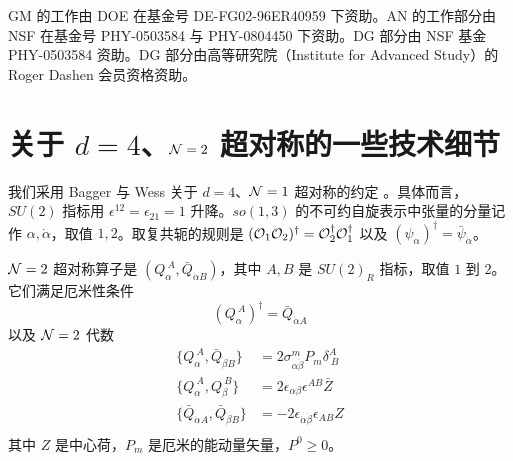 GM 的工作由 DOE 在基金号 DE-FG02-96ER40959 下资助。AN 的工作部分由 NSF 在基金号 PHY-0503584 与 PHY-0804450 下资助。DG 部分由 NSF 基金 PHY-0503584 资助。DG 部分由高等研究院（Institute for Advanced Study）的 Roger Dashen 会员资格资助。

\appendix

\section{关于 $d=4$、$\mathcal{N}=2$ 超对称的一些技术细节}
\label{app:Susy-Conventions}

我们采用 Bagger 与 Wess 关于 $d=4$、$\mathcal{N}=1$ 超对称的约定 \cite{Wess:1992cp}。具体而言，$SU(2)$ 指标用 $\epsilon^{12}= \epsilon_{21}=1$ 升降。$so(1,3)$ 的不可约自旋表示中张量的分量记作 $\alpha,\dot\alpha$，取值 $1,2$。取复共轭的规则是 $(\mathcal{O}_1 \mathcal{O}_2)^\dagger = \mathcal{O}_2^\dagger \mathcal{O}_1^\dagger$ 以及 $(\psi_\alpha)^\dagger = \bar \psi_{\dot \alpha}$。

$\mathcal{N}=2$ 超对称算子是 $(Q_\alpha^{~A}, \bar Q_{\dot \alpha B})$，其中 $A,B$ 是 $SU(2)_R$ 指标，取值 $1$ 到 $2$。它们满足厄米性条件
%
\begin{equation}
(Q_\alpha^{~A})^\dagger = \bar Q_{\dot \alpha A}
\end{equation}
%
以及 $\mathcal{N}=2$ 代数
%
\begin{equation}
\begin{split}
\{ Q_{\alpha}^{~A}, \bar Q_{\dot \beta B} \} & = 2
\sigma^m_{\alpha\dot\beta}P_m \delta^{A}_{~B} \\
\{ Q_{\alpha}^{~A}, Q_{  \beta}^{~ B} \} & = 2 \epsilon_{\alpha\beta}\epsilon^{AB} \bar Z \\
\{ \bar Q_{\dot\alpha A}, \bar Q_{  \dot \beta  B} \} & = -2
\epsilon_{\dot\alpha\dot\beta}\epsilon_{AB}   Z\\
\end{split}
\end{equation}
%
其中 $Z$ 是中心荷，$P_m$ 是厄米的能动量矢量，$P^0 \geq 0$。

